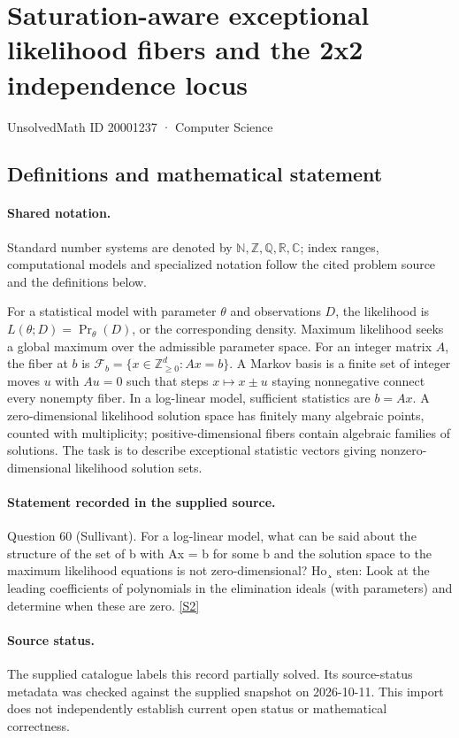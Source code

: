 \documentclass[11pt]{article}
\newcommand{\sref}[2]{\hyperlink{source:#1:#2}{[S#2]}}
\begin{document}
\setcounter{section}{20001236}
\section{Saturation-aware exceptional likelihood fibers and the 2x2 independence locus}\label{20001237}
{\small\sffamily UnsolvedMath ID 20001237 · Computer Science}
\subsection{Definitions and mathematical statement}

\paragraph{Shared notation.}Standard number systems are denoted by $\mathbb N,\mathbb Z,\mathbb Q,\mathbb R,\mathbb C$; index ranges, computational models and specialized notation follow the cited problem source and the definitions below.


For a statistical model with parameter $\theta$ and observations $D$, the likelihood is $L(\theta;D)=\Pr_\theta(D)$, or the corresponding density. Maximum likelihood seeks a global maximum over the admissible parameter space. For an integer matrix $A$, the fiber at $b$ is $\mathcal F_b=\{x\in\mathbb Z_{\ge0}^d:Ax=b\}$. A Markov basis is a finite set of integer moves $u$ with $Au=0$ such that steps $x\mapsto x\pm u$ staying nonnegative connect every nonempty fiber. In a log-linear model, sufficient statistics are $b=Ax$. A zero-dimensional likelihood solution space has finitely many algebraic points, counted with multiplicity; positive-dimensional fibers contain algebraic families of solutions. The task is to describe exceptional statistic vectors giving nonzero-dimensional likelihood solution sets.
\paragraph{Statement recorded in the supplied source.}
Question 60 (Sullivant). For a log-linear model, what can be said about the structure of the set of b with Ax = b for some b and the solution space to the maximum likelihood equations is not zero-dimensional? Ho¸ sten: Look at the leading coefficients of polynomials in the elimination ideals (with parameters) and determine when these are zero. \sref{20001237}{2}
\paragraph{Source status.}
The supplied catalogue labels this record partially solved. Its source-status metadata was checked against the supplied snapshot on 2026-10-11. This import does not independently establish current open status or mathematical correctness.
\end{document}
